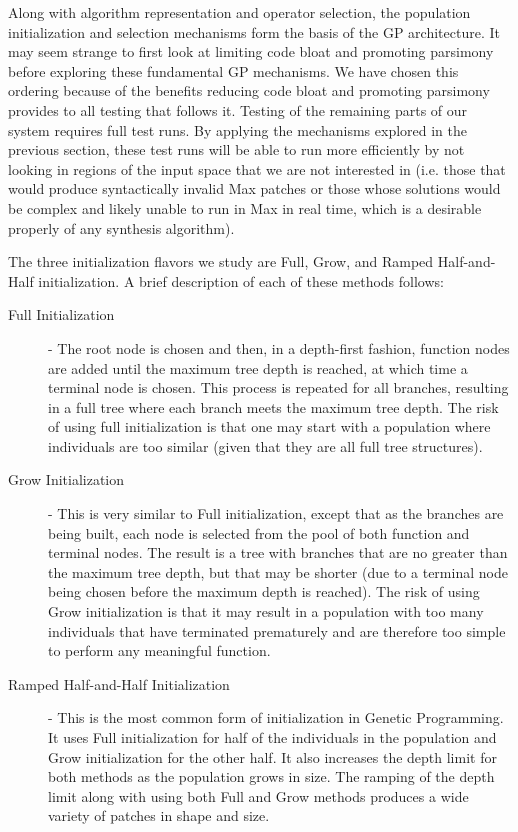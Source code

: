 \documentclass[12pt]{report} 	%
\numberwithin{figure}{chapter}
\numberwithin{table}{chapter}
\numberwithin{equation}{chapter}
\begin{document}
\begin{flushleft}
Along with algorithm representation and operator selection, the population initialization and selection mechanisms form the basis of the GP architecture. It may seem strange to first look at limiting code bloat and promoting parsimony before exploring these fundamental GP mechanisms. We have chosen this ordering because of the benefits reducing code bloat and promoting parsimony provides to all testing that follows it. Testing of the remaining parts of our system requires full test runs. By applying the mechanisms explored in the previous section, these test runs will be able to run more efficiently by not looking in regions of the input space that we are not interested in (i.e. those that would produce syntactically invalid Max patches or those whose solutions would be complex and likely unable to run in Max in real time, which is a desirable properly of any synthesis algorithm).

The three initialization flavors we study are Full, Grow, and Ramped Half-and-Half initialization. A brief description of each of these methods follows:
\begin{description}
\item [Full Initialization] - The root node is chosen and then, in a depth-first fashion, function nodes are added until the maximum tree depth is reached, at which time a terminal node is chosen. This process is repeated for all branches, resulting in a full tree where each branch meets the maximum tree depth. The risk of using full initialization is that one may start with a population where individuals are too similar (given that they are all full tree structures).
\item [Grow Initialization] - This is very similar to Full initialization, except that as the branches are being built, each node is selected from the pool of both function and terminal nodes. The result is a tree with branches that are no greater than the maximum tree depth, but that may be shorter (due to a terminal node being chosen before the maximum depth is reached). The risk of using Grow initialization is that it may result in a population with too many individuals that have terminated prematurely and are therefore too simple to perform any meaningful function.
\item [Ramped Half-and-Half Initialization] - This is the most common form of initialization in Genetic Programming. It uses Full initialization for half of the individuals in the population and Grow initialization for the other half. It also increases the depth limit for both methods as the population grows in size. The ramping of the depth limit along with using both Full and Grow methods produces a wide variety of patches in shape and size.
\end{description}


\end{flushleft}
\end{document}
